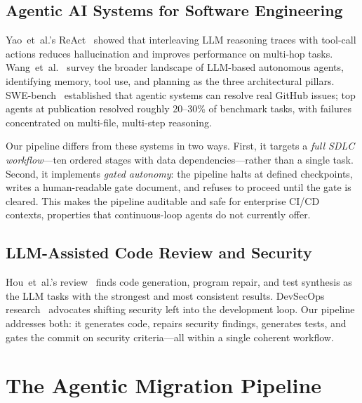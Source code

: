 \documentclass[10pt,journal,compsoc]{IEEEtran}
\begin{document}
\subsection{Agentic AI Systems for Software Engineering}
Yao~et~al.'s ReAct~\cite{yao2023react} showed that interleaving LLM
reasoning traces with tool-call actions reduces hallucination and
improves performance on multi-hop tasks.
Wang~et~al.~\cite{wang2024agents} survey the broader landscape of
LLM-based autonomous agents, identifying memory, tool use, and
planning as the three architectural pillars.
SWE-bench~\cite{jimenez2024swebench} established that agentic systems
can resolve real GitHub issues; top agents at publication resolved
roughly 20–30\% of benchmark tasks, with failures concentrated on
multi-file, multi-step reasoning.

Our pipeline differs from these systems in two ways.
First, it targets a \emph{full SDLC workflow}—ten ordered stages with
data dependencies—rather than a single task.  Second, it implements
\emph{gated autonomy}: the pipeline halts at defined checkpoints,
writes a human-readable gate document, and refuses to proceed until
the gate is cleared.  This makes the pipeline auditable and safe for
enterprise CI/CD contexts, properties that continuous-loop agents do
not currently offer.

\subsection{LLM-Assisted Code Review and Security}
Hou~et~al.'s review~\cite{hou2024llmse} finds code generation, program
repair, and test synthesis as the LLM tasks with the strongest and most
consistent results.  DevSecOps research~\cite{mohan2021devsecops}
advocates shifting security left into the development loop.  Our
pipeline addresses both: it generates code, repairs security findings,
generates tests, and gates the commit on security criteria—all within a
single coherent workflow.

\section{The Agentic Migration Pipeline}
\label{sec:pipeline}
\end{document}

